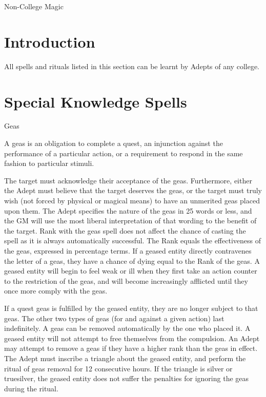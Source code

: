 \begin{Chapter}{Non-College Magic}

\section{Introduction}

All spells and rituals listed in this section can be learnt by Adepts
of any college.


\section{Special Knowledge Spells}

\begin{ritual}{Geas}

\begin{effects}
A geas is an obligation to complete a quest, an injunction against the
performance of a particular action, or a requirement to respond in the
same fashion to particular stimuli.

The target must acknowledge their acceptance of the geas.
Furthermore, either the Adept must believe that the target deserves
the geas, or the target must truly wish (not forced by physical or
magical means) to have an unmerited geas placed upon them. The Adept
specifies the nature of the geas in 25 words or less, and the GM will
use the most liberal interpretation of that wording to the benefit of
the target.  Rank with the geas spell does not affect the chance of
casting the spell as it is always automatically successful.  The Rank
equals the effectiveness of the geas, expressed in percentage terms.
If a geased entity directly contravenes the letter of a geas, they
have a chance of dying equal to the Rank of the geas. A geased entity
will begin to feel weak or ill when they first take an action counter
to the restriction of the geas, and will become increasingly afflicted
until they once more comply with the geas.

If a quest geas is fulfilled by the geased entity, they are no longer
subject to that geas.  The other two types of geas (for and against a
given action) last indefinitely.  A geas can be removed automatically
by the one who placed it. A geased entity will not attempt to free
themselves from the compulsion.  An Adept may attempt to remove a geas
if they have a higher rank than the geas in effect.  The Adept must
inscribe a triangle about the geased entity, and perform the ritual of
geas removal for 12 consecutive hours.  If the triangle is silver or
truesilver, the geased entity does not suffer the penalties for
ignoring the geas during the ritual.


\end{effects}
\end{ritual}
\end{Chapter}

